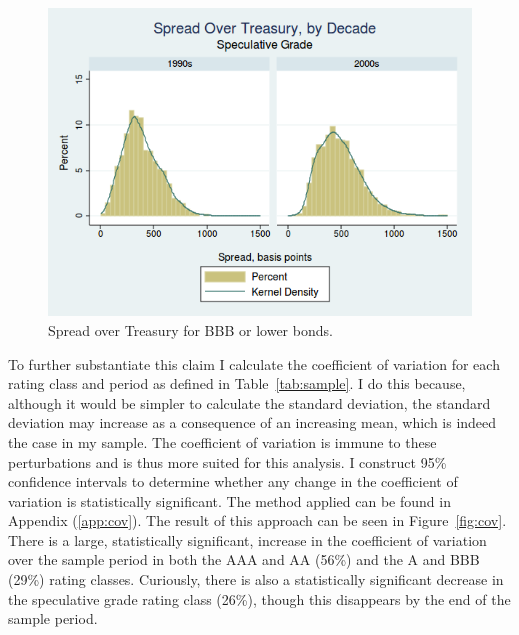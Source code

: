 \documentclass[titlepage]{article}
\begin{document}
\begin{figure}[ht]
\centering
\includegraphics[width=\textwidth]{Spread_SG.png}
\caption{Spread over Treasury for BBB or lower bonds.}
\label{fig:spdSG}
\end{figure}

To further substantiate this claim I calculate the coefficient of variation for each rating class and period as defined in Table~\ref{tab:sample}. I do this because, although it would be simpler to calculate the standard deviation, the standard deviation may increase as a consequence of an increasing mean, which is indeed the case in my sample. The coefficient of variation is immune to these perturbations and is thus more suited for this analysis. I construct 95\% confidence intervals to determine whether any change in the coefficient of variation is statistically significant. The method applied can be found in Appendix (\ref{app:cov}). The result of this approach can be seen in Figure~\ref{fig:cov}. There is a large, statistically significant, increase in the coefficient of variation over the sample period in both the AAA and AA (56\%) and the A and BBB (29\%) rating classes. Curiously, there is also a statistically significant decrease in the speculative grade rating class (26\%), though this disappears by the end of the sample period.
\end{document}

